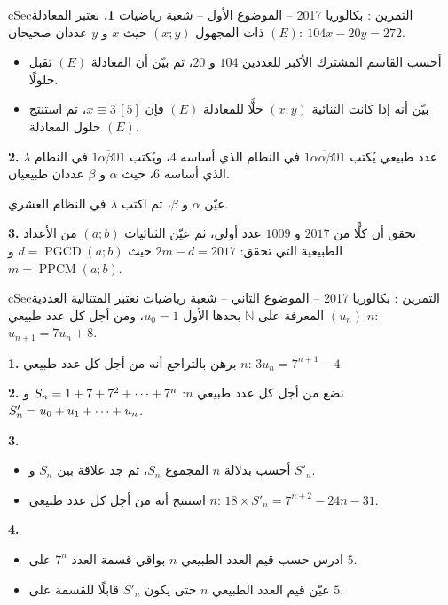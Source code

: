 \documentclass[12pt,a4paper]{article}
\newenvironment{BOX}[2]{\begin{otherlanguage}{english}\begin{arbox}{#1}{#2}}{\end{arbox}\end{otherlanguage}}
\newcounter{exo}
\newenvironment{tamrin}[1]{\stepcounter{exo}\begin{BOX}{cSec}{التمرين \theexo: #1}}{\end{BOX}}
\renewcommand{\cdots}{\mathinner{\cdotp\cdotp\cdotp}}
\newcommand{\N}{\mathbb{N}}
\newcommand{\pgcd}{\operatorname{PGCD}}
\newcommand{\ppcm}{\operatorname{PPCM}}
\newenvironment{sq}{\begin{itemize}[leftmargin=2.4em,itemsep=3pt]}{\end{itemize}}
\newcommand{\qa}{\item[(أ)]}\newcommand{\qb}{\item[(ب)]}\newcommand{\qc}{\item[(جـ)]}\newcommand{\qd}{\item[(د)]}\newcommand{\qe}{\item[(هـ)]}
\begin{document}
\begin{tamrin}{بكالوريا 2017 -- الموضوع الأول -- شعبة رياضيات}
\textbf{1.} نعتبر المعادلة $(E):\ 104x-20y=272$ ذات المجهول $(x;y)$ حيث $x$ و $y$ عددان صحيحان.
\begin{sq}
\qa أحسب القاسم المشترك الأكبر للعددين $104$ و $20$، ثم بيّن أن المعادلة $(E)$ تقبل حلولًا.
\qb بيّن أنه إذا كانت الثنائية $(x;y)$ حلًّا للمعادلة $(E)$ فإن $x\equiv3\,[5]$، ثم استنتج حلول المعادلة $(E)$.
\end{sq}
\textbf{2.} $\lambda$ عدد طبيعي يُكتب $\overline{1\alpha\alpha\beta01}$ في النظام الذي أساسه $4$، ويُكتب $\overline{1\alpha\beta01}$ في النظام الذي أساسه $6$، حيث $\alpha$ و $\beta$ عددان طبيعيان.

عيّن $\alpha$ و $\beta$، ثم اكتب $\lambda$ في النظام العشري.

\textbf{3.} تحقق أن كلًّا من $2017$ و $1009$ عدد أولي، ثم عيّن الثنائيات $(a;b)$ من الأعداد الطبيعية التي تحقق: $2m-d=2017$ حيث $d=\pgcd(a;b)$ و $m=\ppcm(a;b)$.
\end{tamrin}

\begin{tamrin}{بكالوريا 2017 -- الموضوع الثاني -- شعبة رياضيات}
نعتبر المتتالية العددية $(u_n)$ المعرفة على $\N$ بحدها الأول $u_0=1$، ومن أجل كل عدد طبيعي $n$: $u_{n+1}=7u_n+8$.

\textbf{1.} برهن بالتراجع أنه من أجل كل عدد طبيعي $n$: $3u_n=7^{n+1}-4$.

\textbf{2.} نضع من أجل كل عدد طبيعي $n$: $S_n=1+7+7^2+\cdots+7^n$ و $S'_n=u_0+u_1+\cdots+u_n$.

\textbf{3.}
\begin{sq}
\qa أحسب بدلالة $n$ المجموع $S_n$، ثم جد علاقة بين $S_n$ و $S'_n$.
\qb استنتج أنه من أجل كل عدد طبيعي $n$: $18\times S'_n=7^{n+2}-24n-31$.
\end{sq}
\textbf{4.}
\begin{sq}
\qa ادرس حسب قيم العدد الطبيعي $n$ بواقي قسمة العدد $7^n$ على $5$.
\qb عيّن قيم العدد الطبيعي $n$ حتى يكون $S'_n$ قابلًا للقسمة على $5$.
\end{sq}
\end{tamrin}
\end{document}
